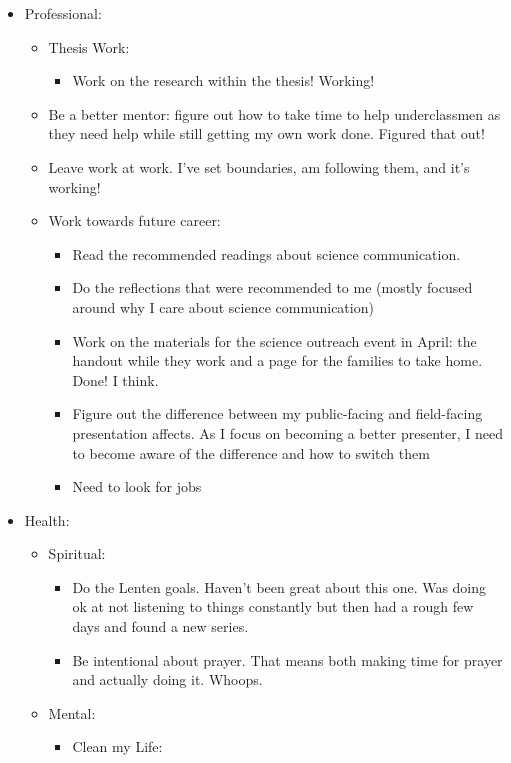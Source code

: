 \documentclass[12pt]{article}[titlepage]
\renewcommand{\,}{\textsuperscript{,}}
\begin{document}
\begin{itemize}   
\item Professional:   
\begin{itemize}   
\item Thesis Work:  
\begin{itemize}   
\item Work on the research within the thesis! Working!  
\end{itemize}   
\item Be a better mentor: figure out how to take time to help underclassmen as they need help while still getting my own work done. Figured that out!  
\item Leave work at work. I've set boundaries, am following them, and it's working!  
\item Work towards future career:   
\begin{itemize}   
\item Read the recommended readings about science communication.  
\item Do the reflections that were recommended to me (mostly focused around why I care about science communication)   
\item Work on the materials for the science outreach event in April: the handout while they work and a page for the families to take home. Done! I think.  
\item Figure out the difference between my public-facing and field-facing presentation affects. As I focus on becoming a better presenter, I need to become aware of the difference and how to switch them   
\item Need to look for jobs  
\end{itemize}   
\end{itemize}   
\item Health:  
\begin{itemize}   
\item Spiritual:   
\begin{itemize}   
\item Do the Lenten goals. Haven't been great about this one. Was doing ok at not listening to things constantly but then had a rough few days and found a new series.  
\item Be intentional about prayer. That means both making time for prayer and actually doing it. Whoops.  
\end{itemize}   
\item Mental:   
\begin{itemize}   
\item Clean my Life:   

\end{itemize}
\end{itemize}
\end{itemize}
\end{document}
